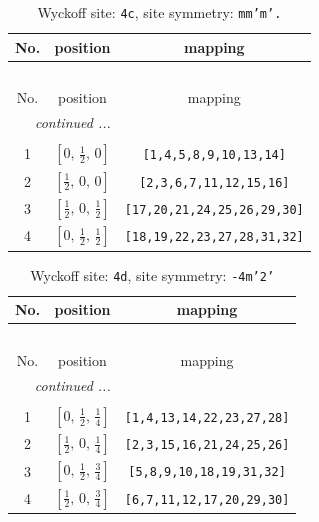 \documentclass[fleqn,8pt]{jsarticle}
\begin{document}
\renewcommand{\arraystretch}{1.2}
\begin{longtable}{ccc}
\caption{Wyckoff site: {\tt 4c}, site symmetry: {\tt mm'm'.}}
 \\
 \hline \hline
No. & position & mapping \\ \hline \endfirsthead

\multicolumn{2}{l}{\tablename\ \thetable{}} \\
 \hline \hline
No. & position & mapping \\ \hline \endhead

 \hline \hline
\multicolumn{2}{r}{\footnotesize\it continued ...} \\ \endfoot

 \hline \hline
\multicolumn{2}{r}{} \\ \endlastfoot

1 & $\left[ 0,\, \frac{1}{2},\, 0 \right]$ & {\tt [1,4,5,8,9,10,13,14]} \\ \hline
2 & $\left[ \frac{1}{2},\, 0,\, 0 \right]$ & {\tt [2,3,6,7,11,12,15,16]} \\ \hline
3 & $\left[ \frac{1}{2},\, 0,\, \frac{1}{2} \right]$ & {\tt [17,20,21,24,25,26,29,30]} \\ \hline
4 & $\left[ 0,\, \frac{1}{2},\, \frac{1}{2} \right]$ & {\tt [18,19,22,23,27,28,31,32]} \\
\end{longtable}
\renewcommand{\arraystretch}{1.2}
\begin{longtable}{ccc}
\caption{Wyckoff site: {\tt 4d}, site symmetry: {\tt -4m'2'}}
 \\
 \hline \hline
No. & position & mapping \\ \hline \endfirsthead

\multicolumn{2}{l}{\tablename\ \thetable{}} \\
 \hline \hline
No. & position & mapping \\ \hline \endhead

 \hline \hline
\multicolumn{2}{r}{\footnotesize\it continued ...} \\ \endfoot

 \hline \hline
\multicolumn{2}{r}{} \\ \endlastfoot

1 & $\left[ 0,\, \frac{1}{2},\, \frac{1}{4} \right]$ & {\tt [1,4,13,14,22,23,27,28]} \\ \hline
2 & $\left[ \frac{1}{2},\, 0,\, \frac{1}{4} \right]$ & {\tt [2,3,15,16,21,24,25,26]} \\ \hline
3 & $\left[ 0,\, \frac{1}{2},\, \frac{3}{4} \right]$ & {\tt [5,8,9,10,18,19,31,32]} \\ \hline
4 & $\left[ \frac{1}{2},\, 0,\, \frac{3}{4} \right]$ & {\tt [6,7,11,12,17,20,29,30]} \\
\end{longtable}
\end{document}
